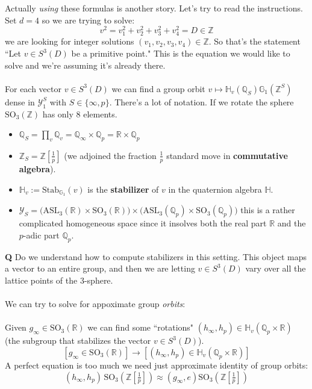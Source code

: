 \documentclass[12pt]{article}
\begin{document}
{\noindent Actually \textit{using} these formulas is another story.  Let's try to read the instructions.  Set $d = 4$ so we are trying to solve:
$$ v^2 = v_1^2 + v_2^2 + v_3^2 + v_4^2 = D \in \mathbb{Z} $$ 
we are looking for integer solutions $(v_1, v_2, v_3, v_4) \in \mathbb{Z}$.  So that's the statement  ``Let $v \in S^3(D)$ be a primitive point."  This is the equation we would like to solve and we're assuming it's already there.\\ \\
For each vector $v \in S^3(D)$ we can find a group orbit $v \mapsto \mathbb{H}_v(\mathbb{Q}_S) \mathbb{G}_1(\mathbb{Z}^S)$ dense in $\mathcal{Y}_1^S$ with $S \in \{ \infty, p\}$. There's a lot of notation.  If we rotate the sphere $\text{SO}_3(\mathbb{Z})$ has only 8 elements.  
\begin{itemize}
\item $\mathbb{Q}_S = \prod_v \mathbb{Q}_v = \mathbb{Q}_\infty \times \mathbb{Q}_p = \mathbb{R} \times \mathbb{Q}_p$ 
\item $\mathbb{Z}_S = \mathbb{Z}[\frac{1}{p}] $ (we adjoined the fraction $\frac{1}{p}$ standard move in \textbf{commutative algebra}).
\item $\mathbb{H}_v := \text{Stab}_{\mathbb{G}_1}(v)$ is the \textbf{stabilizer} of $v$ in the quaternion algebra $\mathbb{H}$.
\item $\mathcal{Y}_S = \big(\text{ASL}_3(\mathbb{R})\times \text{SO}_3(\mathbb{R})\big) \times \big(\text{ASL}_3( \mathbb{Q}_p )\times \text{SO}_3(\mathbb{Q}_p)\big)$
this is a rather complicated homogeneous space since it insolves both the real part $\mathbb{R}$ and the $p$-adic part $\mathbb{Q}_p$. \end{itemize}
\textbf{Q} Do we understand how to compute stabilizers in this setting.  This object maps a vector to an entire group, and then we are letting $v \in S^3(D)$ vary over all the lattice points of the $3$-sphere. \\ \\
We can try to solve for appoximate group \textit{orbits}: \\ \\
Given $g_\infty \in \text{SO}_3(\mathbb{R}) $ we can find some ``rotations" $(h_\infty, h_p) \in \mathbb{H}_v(\mathbb{Q}_p \times \mathbb{R})  $ (the subgroup that stabilizes the vector $v \in S^3(D)$).
$$ [g_\infty \in \text{SO}_3(\mathbb{R})] \to [ (h_\infty, h_p) \in \mathbb{H}_v(\mathbb{Q}_p \times \mathbb{R}) ] $$
A perfect equation is too much we need just approximate identity of group orbits:
$$ (h_\infty, h_p) \,\text{SO}_3 ( \mathbb{Z}[\tfrac{1}{p}] ) \approx (g_\infty, e)\text{SO}_3 ( \mathbb{Z}[\tfrac{1}{p}] ) $$
}
\end{document}
